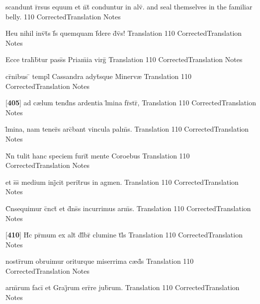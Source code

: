 \latline
  {scandunt r\={}rsus equum et n\={}t\={} conduntur in alv\={}.}
  { and seal themselves in the familiar belly. }
  {110}
  { CorrectedTranslation }
  { Notes }


\latline
  {Heu nihil inv\={\macron {\i}}t\={\macron {\i}}s f\={}s quemquam f\={\macron {\i}}dere d\={\macron {\i}}v\={\macron {\i}}s!}
  { Translation }
  {110}
  { CorrectedTranslation }
  { Notes }


\latline
  {Ecce trah\={}b\={}tur pass\={\macron {\i}}s Priam\={}ia virg\={}}
  { Translation }
  {110}
  { CorrectedTranslation }
  { Notes }


\latline
  {cr\={\macron {\i}}nibus \={} templ\={} Cassandra adyt\={\macron {\i}}sque Minerv{\ae}}
  { Translation }
  {110}
  { CorrectedTranslation }
  { Notes }


\latline
  {[\textbf{405}] ad c{\ae}lum tend\={}ns ardentia l\={}mina fr\={}str\={},}
  { Translation }
  {110}
  { CorrectedTranslation }
  { Notes }


\latline
  {l\={}mina, nam tener\={}s arc\={}bant vincula palm\={}s.}
  { Translation }
  {110}
  { CorrectedTranslation }
  { Notes }


\latline
  {N\={}n tulit hanc speciem furi\={}t\={} mente Coroebus}
  { Translation }
  {110}
  { CorrectedTranslation }
  { Notes }


\latline
  {et s\={}s\={} medium inj\={}cit perit\={}rus in agmen.}
  { Translation }
  {110}
  { CorrectedTranslation }
  { Notes }


\latline
  {C\={}nsequimur c\={}nct\={\macron {\i}} et d\={}ns\={\macron {\i}}s incurrimus arm\={\macron {\i}}s.}
  { Translation }
  {110}
  { CorrectedTranslation }
  { Notes }


\latline
  {[\textbf{410}] H\={\macron {\i}}c pr\={\macron {\i}}mum ex alt\={} d\={}l\={}br\={\macron {\i}} clumine t\={}l\={\macron {\i}}s}
  { Translation }
  {110}
  { CorrectedTranslation }
  { Notes }


\latline
  {nostr\={}rum obruimur oriturque miserrima c{\ae}d\={}s}
  { Translation }
  {110}
  { CorrectedTranslation }
  { Notes }


\latline
  {arm\={}rum faci\={} et Graj\={}rum err\={}re jub\={}rum.}
  { Translation }
  {110}
  { CorrectedTranslation }
  { Notes }



